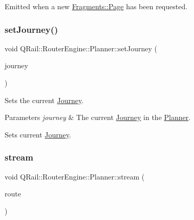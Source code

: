 Emitted when a new \mbox{\hyperlink{classQRail_1_1Fragments_1_1Page}{Fragments\+::\+Page}} has been requested. 

\mbox{\label{classQRail_1_1RouterEngine_1_1Planner_af4aefc8b116590f0641da489e0c8832a}} 
\subsubsection{\texorpdfstring{setJourney()}{setJourney()}}
{\footnotesize\ttfamily void Q\+Rail\+::\+Router\+Engine\+::\+Planner\+::set\+Journey (\begin{DoxyParamCaption}\item[{\mbox{\hyperlink{classQRail_1_1RouterEngine_1_1Journey}{Q\+Rail\+::\+Router\+Engine\+::\+Journey}} $\ast$}]{journey }\end{DoxyParamCaption})}



Sets the current \mbox{\hyperlink{classQRail_1_1RouterEngine_1_1Journey}{Journey}}. 


\begin{DoxyParams}{Parameters}
{\em journey} & The current \mbox{\hyperlink{classQRail_1_1RouterEngine_1_1Journey}{Journey}} in the \mbox{\hyperlink{classQRail_1_1RouterEngine_1_1Planner}{Planner}}.\\
\hline
\end{DoxyParams}
Sets current \mbox{\hyperlink{classQRail_1_1RouterEngine_1_1Journey}{Journey}}. \mbox{\label{classQRail_1_1RouterEngine_1_1Planner_a0221f287017cfb3a24826d1ce349120c}} 
\subsubsection{\texorpdfstring{stream}{stream}}
{\footnotesize\ttfamily void Q\+Rail\+::\+Router\+Engine\+::\+Planner\+::stream (\begin{DoxyParamCaption}\item[{\mbox{\hyperlink{classQRail_1_1RouterEngine_1_1Route}{Q\+Rail\+::\+Router\+Engine\+::\+Route}} $\ast$}]{route }\end{DoxyParamCaption})\hspace{0.3cm}{\ttfamily [signal]}}



